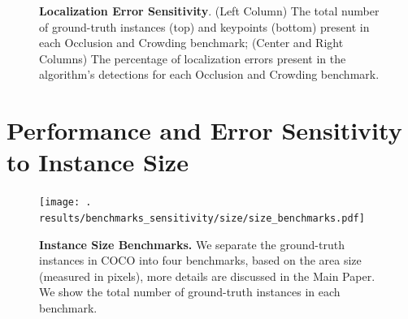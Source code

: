 \documentclass[10pt,onecolumn,letterpaper]{article}
\begin{document}
\vspace{-3mm}
\begin{figure}[h!]
\centering
{}
\caption{ {\small \textbf{Localization Error Sensitivity}. (Left Column) The total number of ground-truth instances (top) and keypoints (bottom) present
 in each Occlusion and Crowding benchmark; (Center and Right Columns) The percentage of localization errors present in the algorithm's detections for each Occlusion and Crowding benchmark.}}
\end{figure}
\clearpage

\section{Performance and Error Sensitivity to Instance Size}

\begin{figure}[h!]
\centering
\texttt{[image: .\\results/benchmarks\_sensitivity/size/size\_benchmarks.pdf]}
\caption{ {\small \textbf{Instance Size Benchmarks.} We separate the ground-truth instances in COCO into four benchmarks, based on the area size (measured in pixels),
more details are discussed in the Main Paper. We show the total number of ground-truth instances in each benchmark.}}
\end{figure}
\end{document}
